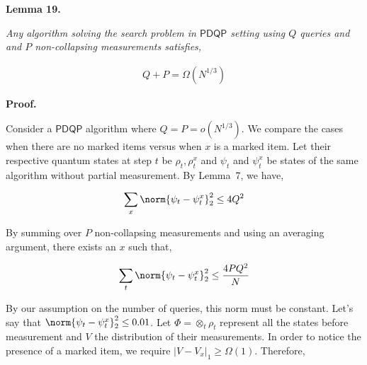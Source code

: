 

\par\medskip\noindent\textbf{
\textbf{Lemma 19}\textbf{.}
}\par



\emph{Any algorithm solving the search problem in $\mathsf{PDQP}$ setting using $Q$ queries and and $P$ non-collapsing measurements satisfies,}\par


\[\begin{gathered}
\displaystyle Q+P=\Omega(N^{1/3})
\end{gathered}\]






\par\medskip\noindent\textbf{Proof.}\par




Consider a $\mathsf{PDQP}$ algorithm where $Q=P=o(N^{1/3})$. We compare the cases when there are no marked items versus when $x$ is a marked item. Let their respective quantum states at step $t$ be $\rho_{t},\rho_{t}^{x}$ and $\psi_{t}$ and $\psi_{t}^{x}$ be states of the same algorithm without partial measurement. By Lemma 7, we have,\par


\[\begin{gathered}
\displaystyle\sum_{x}\norm{\psi_{t}-\psi_{t}^{x}}^{2}_{2}\leq 4Q^{2}
\end{gathered}\]




By summing over $P$ non-collapsing measurements and using an averaging argument, there exists an $x$ such that,\par


\[\begin{gathered}
\displaystyle\sum_{t}\norm{\psi_{t}-\psi_{t}^{x}}^{2}_{2}\leq\frac{4PQ^{2}}{N}
\end{gathered}\]




By our assumption on the number of queries, this norm must be constant. Let’s say that $\norm{\psi_{t}-\psi_{t}^{x}}_{2}^{2}\leq 0.01$. Let $\Phi=\otimes_{t}\rho_{t}$ represent all the states before measurement and $V$ the distribution of their measurements. In order to notice the presence of a marked item, we require $|V-V_{x}|_{1}\geq\Omega(1)$. Therefore,\par


